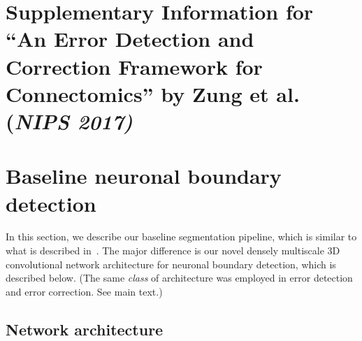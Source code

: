 
\section*{Supplementary Information for ``An Error Detection and Correction Framework for Connectomics'' by Zung et al. (\textsl{NIPS 2017)}}

\appendix
\renewcommand\thefigure{S\arabic{figure}}

\section{Baseline neuronal boundary detection}
\label{appendix:baseline}

In this section, we describe our baseline segmentation pipeline, which is
similar to what is described in~\cite{kisuk}. The major difference is our novel
densely multiscale 3D convolutional network architecture for neuronal boundary
detection, which is described below. (The same \emph{class} of architecture
was employed in error detection and error correction. See main text.)

\subsection{Network architecture}
\label{sec:deltanet}

